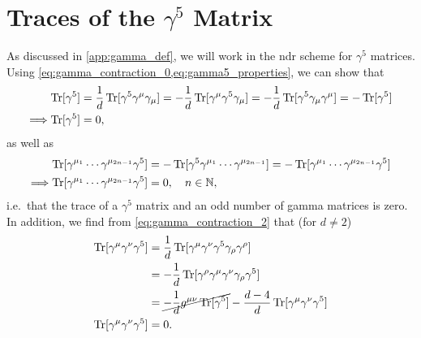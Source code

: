 \section{Traces of the \texorpdfstring{$\gamma^5$}{gamma5} Matrix}\label{app:gamma5}
As discussed in \cref{app:gamma_def}, we will work in the \gls{ndr} scheme for $\gamma^5$ matrices.
Using \cref{eq:gamma_contraction_0,eq:gamma5_properties}, we can show that
\begin{align}
    \operatorname{Tr}[\gamma^5] &= \frac{1}{d}\operatorname{Tr}[\gamma^5\gamma^\mu\gamma_\mu] = -\frac{1}{d}\operatorname{Tr}[\gamma^\mu\gamma^5\gamma_\mu] = -\frac{1}{d}\operatorname{Tr}[\gamma^5\gamma_\mu\gamma^\mu] = -\operatorname{Tr}[\gamma^5]
    \nonumber\\
    \Longrightarrow \operatorname{Tr}[\gamma^5] &= 0,
\end{align}
as well as
\begin{align}
    \operatorname{Tr}[\gamma^{\mu_1}\cdots\gamma^{\mu_{2n-1}}\gamma^5] &= -\operatorname{Tr}[\gamma^5\gamma^{\mu_1}\cdots\gamma^{\mu_{2n-1}}] = -\operatorname{Tr}[\gamma^{\mu_1}\cdots\gamma^{\mu_{2n-1}}\gamma^5]
    \nonumber\\
    \Longrightarrow \operatorname{Tr}[\gamma^{\mu_1}\cdots\gamma^{\mu_{2n-1}}\gamma^5] &= 0, \quad n\in\mathbb{N},
\end{align}
i.e.\ that the trace of a $\gamma^5$ matrix and an odd number of gamma matrices is zero.
In addition, we find from \cref{eq:gamma_contraction_2} that (for $d\neq2$)
\begin{align}\label{eq:trace_gamma5_2}
    \operatorname{Tr}[\gamma^\mu\gamma^\nu\gamma^5] &= \frac{1}{d}\operatorname{Tr}[\gamma^\mu\gamma^\nu\gamma^5\gamma_\rho\gamma^\rho]
    \nonumber \\
    &= -\frac{1}{d}\operatorname{Tr}[\gamma^\rho\gamma^\mu\gamma^\nu\gamma_\rho\gamma^5]
    \nonumber \\
    &= \cancel{-\frac{1}{d}g^{\mu\nu}\operatorname{Tr}[\gamma^5]} - \frac{d-4}{d} \operatorname{Tr}[\gamma^\mu\gamma^\nu\gamma^5]
    \nonumber \\
    \operatorname{Tr}[\gamma^\mu\gamma^\nu\gamma^5] &= 0.
\end{align}

